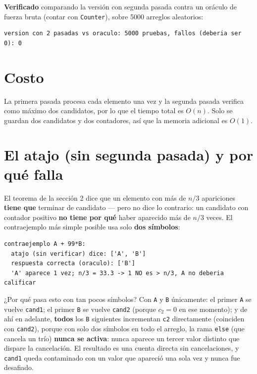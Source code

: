 \documentclass[11pt]{article}
\begin{document}
\textbf{Verificado} comparando la versión con segunda pasada contra un oráculo de fuerza bruta (contar con
\texttt{Counter}), sobre 5000 arreglos aleatorios:
\begin{lstlisting}[style=salida]
version con 2 pasadas vs oraculo: 5000 pruebas, fallos (deberia ser 0): 0
\end{lstlisting}

\section{Costo}

La primera pasada procesa cada elemento una vez y la segunda pasada verifica como máximo dos candidatos,
por lo que el tiempo total es $O(n)$. Solo se guardan dos candidatos y dos contadores, así que la memoria
adicional es $O(1)$.

\section{El atajo (sin segunda pasada) y por qué falla}



El teorema de la sección 2 dice que un elemento con más de $n/3$ apariciones \textbf{tiene que} terminar de
candidato --- pero no dice lo contrario: un candidato con contador positivo \textbf{no tiene por qué} haber
aparecido más de $n/3$ veces. El contraejemplo más simple posible usa solo \textbf{dos símbolos}:

\begin{lstlisting}[style=salida]
contraejemplo A + 99*B:
  atajo (sin verificar) dice: ['A', 'B']
  respuesta correcta (oraculo): ['B']
  'A' aparece 1 vez; n/3 = 33.3 -> 1 NO es > n/3, A no deberia calificar
\end{lstlisting}

¿Por qué pasa esto con tan pocos símbolos? Con \texttt{A} y \texttt{B} únicamente: el primer \texttt{A} se
vuelve \texttt{cand1}; el primer \texttt{B} se vuelve \texttt{cand2} (porque $c_2=0$ en ese momento); y de
ahí en adelante, \textbf{todos} los \texttt{B} siguientes incrementan \texttt{c2} directamente (coinciden
con \texttt{cand2}), porque con solo dos símbolos en todo el arreglo, la rama \texttt{else} (que cancela un
trío) \textbf{nunca se activa}: nunca aparece un tercer valor distinto que dispare la cancelación. El
resultado es una cuenta directa sin cancelaciones, y \texttt{cand1} queda contaminado con un valor que
apareció una sola vez y nunca fue desafiado.
\end{document}
